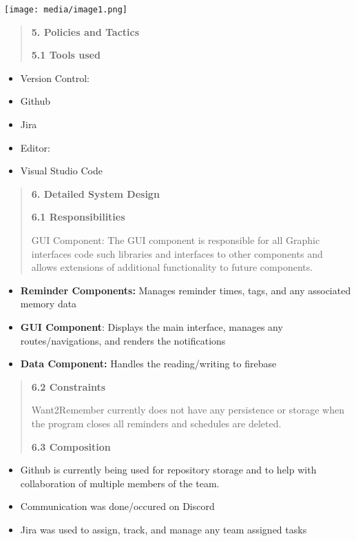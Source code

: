 \documentclass[
]{article}
\begin{document}
\texttt{[image: media/image1.png]}

\begin{quote}
\textbf{5. Policies and Tactics}

\textbf{5.1 Tools used}
\end{quote}

\begin{itemize}
\item
  Version Control:
\item
  Github
\end{itemize}

\begin{itemize}
\item
  Jira
\item
  Editor:
\item
  Visual Studio Code
\end{itemize}

\begin{quote}
\textbf{6. Detailed System Design}

\textbf{6.1 Responsibilities}

GUI Component: The GUI component is responsible for all Graphic
interfaces code such libraries and interfaces to other components and
allows extensions of additional functionality to future components.
\end{quote}

\begin{itemize}
\item
  \textbf{Reminder Components:} Manages reminder times, tags, and any
  associated memory data
\item
  \textbf{GUI Component}: Displays the main interface, manages any
  routes/navigations, and renders the notifications
\item
  \textbf{Data Component:} Handles the reading/writing to firebase
\end{itemize}

\begin{quote}
\textbf{6.2 Constraints}

Want2Remember currently does not have any persistence or storage when
the program closes all reminders and schedules are deleted.

\textbf{6.3 Composition}
\end{quote}

\begin{itemize}
\item
  Github is currently being used for repository storage and to help with
  collaboration of multiple members of the team.
\item
  Communication was done/occured on Discord
\item
  Jira was used to assign, track, and manage any team assigned tasks
\end{itemize}
\end{document}
